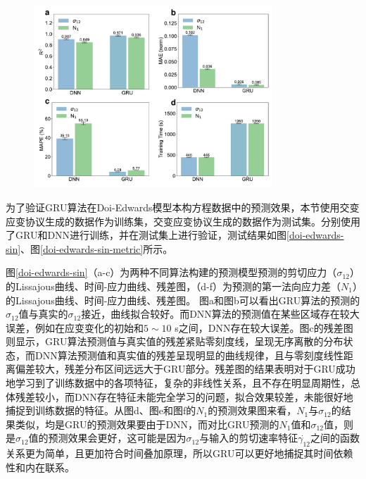 \begin{figure}[htbp]
  \centering
  \includegraphics[width=0.8\textwidth]{Fig/doi-edwards-sin-metrics.pdf}
\end{figure}
为了验证GRU算法在Doi-Edwards模型本构方程数据中的预测效果，本节使用交变应变协议生成的数据作为训练集，交变应变协议生成的数据作为测试集。分别使用了GRU和DNN进行训练，并在测试集上进行验证，测试结果如图\ref{doi-edwards-sin}、图\ref{doi-edwards-sin-metric}所示。

图\ref{doi-edwards-sin}（a-c）为两种不同算法构建的预测模型预测的剪切应力（$\sigma_{12}$）的Lissajous曲线、时间-应力曲线、残差图，（d-f）为预测的第一法向应力差（$N_1$）的Lissajous曲线、时间-应力曲线、残差图。
图a和图b可以看出GRU算法的预测的$\sigma_{12}$值与真实的$\sigma_{12}$接近，曲线拟合较好。而DNN算法的预测值在某些区域存在较大误差，例如在应变变化的初始和$5\sim10$ s之间，DNN存在较大误差。图c的残差图则显示，GRU算法预测值与真实值的残差紧贴零刻度线，呈现无序离散的分布状态，而DNN算法预测值和真实值的残差呈现明显的曲线规律，且与零刻度线性距离偏差较大，残差分布区间远远大于GRU部分。残差图的结果表明对于GRU成功地学习到了训练数据中的各项特征，复杂的非线性关系，且不存在明显周期性，总体残差较小，而DNN存在特征未能完全学习的问题，拟合效果较差，未能很好地捕捉到训练数据的特征。从图d、图e和图f的$N_1$的预测效果图来看，$N_1$与$\sigma_{12}$的结果类似，均是GRU的预测效果要由于DNN，而对比GRU预测的$N_1$值和$\sigma_{12}$值，则是$\sigma_{12}$值的预测效果会更好，这可能是因为$\sigma_{12}$与输入的剪切速率特征$\dot{\gamma_{12}}$之间的函数关系更为简单，且更加符合时间叠加原理，所以GRU可以更好地捕捉其时间依赖性和内在联系。


